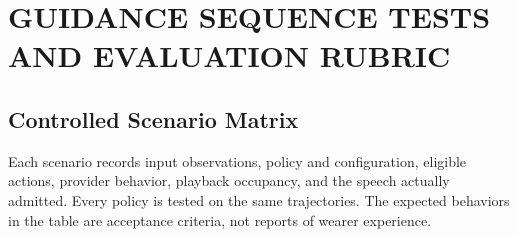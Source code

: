 \chapter{GUIDANCE SEQUENCE TESTS AND EVALUATION RUBRIC}
\label{app:scenarios}
\newpage
\section{Controlled Scenario Matrix}
Each scenario records input observations, policy and configuration, eligible actions, provider behavior, playback occupancy, and the speech actually admitted. Every policy is tested on the same trajectories. The expected behaviors in the table are acceptance criteria, not reports of wearer experience.

\begingroup
{}
